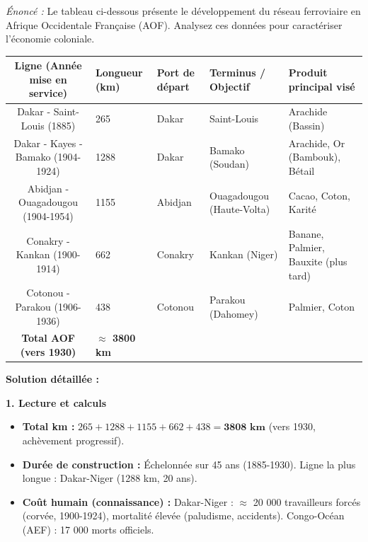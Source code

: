 \documentclass[11pt]{article}
\begin{document}
\begin{exoresolu}
\emph{Énoncé :} Le tableau ci-dessous présente le développement du réseau ferroviaire en Afrique Occidentale Française (AOF). Analysez ces données pour caractériser l'économie coloniale.
\begin{center}
\begin{tabularx}{\linewidth}{|c|X|X|X|X|}
\hline
\rowcolor{popblueL}
\textbf{Ligne (Année mise en service)} & \textbf{Longueur (km)} & \textbf{Port de départ} & \textbf{Terminus / Objectif} & \textbf{Produit principal visé} \\
\hline
Dakar - Saint-Louis (1885) & 265 & Dakar & Saint-Louis & Arachide (Bassin) \\
\hline
Dakar - Kayes - Bamako (1904-1924) & 1288 & Dakar & Bamako (Soudan) & Arachide, Or (Bambouk), Bétail \\
\hline
Abidjan - Ouagadougou (1904-1954) & 1155 & Abidjan & Ouagadougou (Haute-Volta) & Cacao, Coton, Karité \\
\hline
Conakry - Kankan (1900-1914) & 662 & Conakry & Kankan (Niger) & Banane, Palmier, Bauxite (plus tard) \\
\hline
Cotonou - Parakou (1906-1936) & 438 & Cotonou & Parakou (Dahomey) & Palmier, Coton \\
\hline
\textbf{Total AOF (vers 1930)} & \textbf{$\approx$ 3800 km} & & & \\
\hline
\end{tabularx}
\end{center}
\tcblower
\textbf{Solution détaillée :}

\textbf{1. Lecture et calculs}
\begin{itemize}
    \item \textbf{Total km :} $265 + 1288 + 1155 + 662 + 438 = \mathbf{3808 \text{ km}}$ (vers 1930, achèvement progressif).
    \item \textbf{Durée de construction :} Échelonnée sur 45 ans (1885-1930). Ligne la plus longue : Dakar-Niger (1288 km, 20 ans).
    \item \textbf{Coût humain (connaissance) :} Dakar-Niger : $\approx$ 20 000 travailleurs forcés (corvée, 1900-1924), mortalité élevée (paludisme, accidents). Congo-Océan (AEF) : 17 000 morts officiels.
\end{itemize}


\end{exoresolu}
\end{document}
